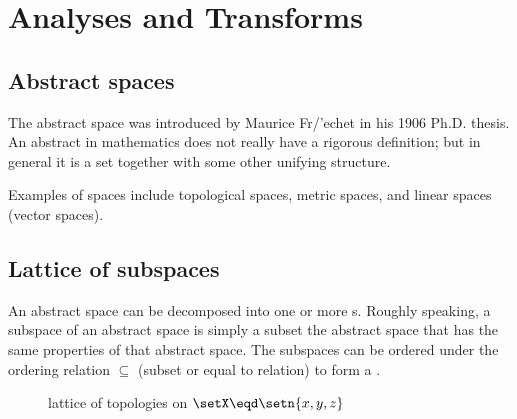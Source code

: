 ﻿%


\chapter{Analyses and Transforms}
\section{Abstract spaces}
The abstract space was introduced by Maurice Fr{/'e}chet in his 1906 Ph.D. thesis.
An abstract  in mathematics does not really have a rigorous definition;
but in general it is a set together with some other unifying structure.

Examples of spaces include topological spaces, metric spaces, and linear spaces (vector spaces).

\section{Lattice of subspaces}
An abstract space can be decomposed into one or more s. 
Roughly speaking, a subspace of an abstract space is simply a subset the abstract space 
that has the same properties of that abstract space.
The subspaces can be ordered under the ordering relation $\subseteq$ (subset or equal to relation)
to form a .

\begin{figure}[th]
\begin{center}

\end{center}
\caption{
  lattice of topologies on $\setX\eqd\setn{x,y,z}$ 
  \label{fig:set_latlat_top_xyz}
  }
\end{figure}


